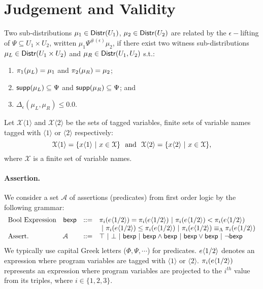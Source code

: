 \documentclass[a4paper,11pt]{article}
\begin{document}
\section{Judgement and Validity}
%
\begin{defn}
Two sub-distributions $\mu_1 \in \mathsf{Distr}(U_1)$, $\mu_2 \in \mathsf{Distr}(U_2)$ are related by the $\epsilon-$lifting of $\Psi \subseteq U_1 \times U_2$, written $\mu_1 \Psi^{\#(\epsilon)} \mu_2$, if there exist two witness sub-distributions $\mu_L \in \mathsf{Distr}(U_1 \times U_2)$ and $\mu_R \in \mathsf{Distr}(U_1, U_2)$ s.t.:
\begin{enumerate}
	\item $\pi_1(\mu_L) = \mu_1$ and $\pi_2(\mu_R) = \mu_2$;
	\item $\mathsf{supp}(\mu_L) \subseteq \Psi$ and $\mathsf{supp}(\mu_R) \subseteq \Psi$; and
	\item $\Delta_{\epsilon}(\mu_L, \mu_R) \leq 0.0$.
\end{enumerate}
\end{defn}
%
\begin{defn}
Let $\mathcal{X}\langle 1 \rangle$ and $\mathcal{X}\langle 2 \rangle$ be the sets of tagged variables, finite sets of variable names tagged with $\langle 1 \rangle$ or $\langle 2 \rangle$ respectively:
\[
	\mathcal{X}\langle 1 \rangle = \{x\langle 1 \rangle ~|~ x \in \mathcal{X}\}
	~~
	\text{and}
	~~
	\mathcal{X}\langle 2 \rangle = \{x\langle 2 \rangle ~|~ x \in \mathcal{X}\},
\]
where $\mathcal{X}$ is a finite set of variable names.
\end{defn}
%
\paragraph{Assertion.} We consider a set $\mathcal{A}$ of assertions (predicates) from first order logic by the following grammar:
\[
\begin{array}{llll}
%
\mbox{Bool Expression} & \bexp & :: = & 
\pi_i(\expr\langle 1 / 2 \rangle) = \pi_i(\expr\langle 1 / 2 \rangle)  
 ~|~ \pi_i(\expr\langle 1 / 2 \rangle) < \pi_i(\expr\langle 1 / 2 \rangle) \\
 & & &
 ~|~ \pi_i(\expr\langle 1 / 2 \rangle) \leq \pi_i(\expr\langle 1 / 2 \rangle)
 ~|~ \pi_i(\expr\langle 1 / 2 \rangle) \lameq \pi_i(\expr\langle 1 / 2 \rangle)
	\\
%
\mbox{Assert.} & \mathcal{A} & ::= & \top ~|~ \bot ~|~ \bexp 
	~|~ \bexp \land \bexp ~|~ \bexp \lor \bexp ~|~ \neg \bexp
\end{array}
\]
%
We typically use capital Greek letters ($\Phi, \Psi, \cdots$) for predicates. 
%
$e\langle 1 / 2 \rangle$ denotes an expression where program variables are tagged with $\langle 1 \rangle$ or $\langle 2 \rangle$.
%
$\pi_i(e\langle 1 / 2 \rangle)$ represents an expression where program variables are projected to the $i^{th}$ value from its triples, where $i \in \{1, 2, 3\}$.
%
\end{document}
